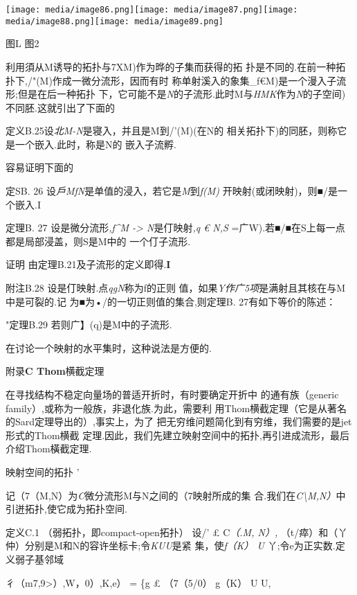 \texttt{[image: media/image86.png]}\texttt{[image: media/image87.png]}\texttt{[image: media/image88.png]}\texttt{[image: media/image89.png]}

图L 图2

利用須从M诱导的拓扑与7XM)作为晔的子集而获得的拓
扑是不同的.在前一种拓扑下,/"(M)作成一微分流形，因而有时
称单射溪入的象集\_f€M)是一个漫入子流形;但是在后一种拓扑
下，它可能不是\emph{N}的子流形.此时M与\emph{HMK}作为\emph{N}的子空间)
不同胚.这就引出了下面的

定义B.25设\emph{北M-N}是寝入，并且是M到/'(M)(在N的
相关拓扑下)的同胚，则称它是一个嵌入.此时，称是N的 嵌入子流孵.

容易证明下面的

定SB. 26 设\emph{戶MfN}是单值的浸入，若它是\emph{M}到\emph{f(M)}
开映射(或闭映射)，则■/是一个嵌入.I

定理B. 27 设是微分流形\emph{,f\^{}M -\textgreater{} N}是仃映射\emph{,q €
N,S} =广W).若■/■在S上每一点都是局部浸盖，则S是M中的 一个仃子流形.

证明 由定理B.21及子流形的定义即得.\textbf{I}

附注B.28 设是仃映射.点\emph{qgN}称为f的正则
值，如果\emph{Y作广5项}是满射且其核在与M中是可裂的.记
为■为•/的一切正则值的集合,则定理B. 27有如下等价的陈述：

"定理B.29 若则广】(q)是M中的子流形.\textbar{}

在讨论一个映射的水平集时，这种说法是方便的.

附录\textbf{C Thom}横截定理

在寻找结构不稳定向量场的普适开折时，有时要确定开折中 的通有族（generic
family）,或称为一般族，非退化族.为此，需要利
用Thom横截定理（它是从著名的Sard定理导出的）,事实上，为了
把无穷维问题简化到有穷维，我们需要的是jet形式的Thom横截
定理.因此，我们先建立映射空间中的拓扑,再引进成流形，最后
介绍Thom橫截定理.

映射空间的拓扑 '

记（7（M,N）为\emph{C}微分流形M与N之间的（7映射所成的集
合.我们在\emph{C\textbackslash{}M,N）}中引迸拓扑,使它成为拓扑空间.

定义C.1 （弱拓扑，即compact-open拓扑） 设/' £ C\emph{（.M, N）,}
（t/瘁）和（丫仲）分别是M和N的容许坐标卡;令\emph{KUU}是紧
集，使\emph{f（K） U} 丫;令e为正实数.定义弱子基邻域

彳（m7,9\textgreater{}）,W，0）,K,e） = \{g £ （7（5/0）
\textbar{}g（K） U U,


